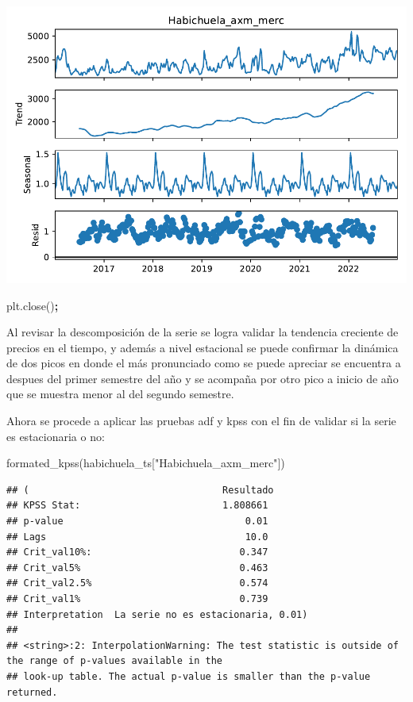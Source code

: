 \documentclass[
]{book}
\newenvironment{Shaded}{\begin{snugshade}}{\end{snugshade}}
\newcommand{\NormalTok}[1]{#1}
\newcommand{\OperatorTok}[1]{\textcolor[rgb]{0.81,0.36,0.00}{\textbf{#1}}}
\newcommand{\StringTok}[1]{\textcolor[rgb]{0.31,0.60,0.02}{#1}}
\begin{document}
\includegraphics{bookdown-demo_files/figure-latex/unnamed-chunk-68-35.pdf}

\begin{Shaded}
\begin{Highlighting}[]
\NormalTok{plt.close()}\OperatorTok{;}
\end{Highlighting}
\end{Shaded}

Al revisar la descomposición de la serie se logra validar la tendencia creciente de precios en el tiempo, y además a nivel estacional se puede confirmar la dinámica de dos picos en donde el más pronunciado como se puede apreciar se encuentra a despues del primer semestre del año y se acompaña por otro pico a inicio de año que se muestra menor al del segundo semestre.

Ahora se procede a aplicar las pruebas adf y kpss con el fin de validar si la serie es estacionaria o no:

\begin{Shaded}
\begin{Highlighting}[]

\NormalTok{formated\_kpss(habichuela\_ts[}\StringTok{"Habichuela\_axm\_merc"}\NormalTok{])}
\end{Highlighting}
\end{Shaded}

\begin{verbatim}
## (                                  Resultado
## KPSS Stat:                         1.808661
## p-value                                0.01
## Lags                                   10.0
## Crit_val10%:                          0.347
## Crit_val5%                            0.463
## Crit_val2.5%                          0.574
## Crit_val1%                            0.739
## Interpretation  La serie no es estacionaria, 0.01)
## 
## <string>:2: InterpolationWarning: The test statistic is outside of the range of p-values available in the
## look-up table. The actual p-value is smaller than the p-value returned.
\end{verbatim}
\end{document}
